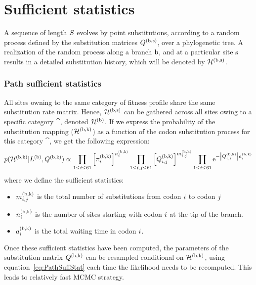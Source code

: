 \section{Sufficient statistics}

A sequence of length $S$ evolves by point \glspl{substitution}, according to a random process defined by the \gls{substitution} matrices $Q^{(\text{b}, \text{s})}$, over a phylogenetic tree.
A realization of the random process along a branch $\text{b}$, and at a particular site $\text{s}$ results in a detailed \gls{substitution} history, which will be denoted by $\mathcal{H}^{(\text{b}, \text{s})}$.

\subsubsection{Path sufficient statistics}
All sites owning to the same category of fitness profile share the same \gls{substitution} rate matrix.
Hence, $\mathcal{H}^{(\text{b}, \text{s})}$ can be gathered across all sites owing to a specific category $\cat$, denoted $\mathcal{H}^{(\text{b})}$.
If we express the probability of the \gls{substitution} mapping ($\mathcal{H}^{(\text{b}, \text{k})}$) as a function of the \gls{codon} \gls{substitution} process for this category $\cat$, we get the following expression:
\begin{equation}
    \label{eq:PathSuffStat}
    p(\mathcal{H}^{(\text{b}, \text{k})} | L^{(\text{b})}, Q^{(\text{b}, \text{k})}) \propto \prod_{1 \leq {i} \leq 61} \left[\pi_{{i}}^{(\text{b}, \text{k})}\right]^{n_{{i}}^{(\text{b}, \text{k})}} \prod_{ 1 \leq {i}, {j} \leq 61} \left[Q^{(\text{b}, \text{k})}_{{i}, {j}}\right]^{m_{{i}, {j}}^{(\text{b}, \text{k})}} \prod_{1 \leq {i} \leq 61} \mathrm{e}^{- \left| Q^{(\text{b}, \text{k})}_{{i}, {i}}\right| a_{{i}}^{(\text{b}, \text{k})}}
\end{equation}
where we define the sufficient statistics:
\begin{itemize}
    \setlength\itemsep{-0.25em}
    \item $m_{{i}, {j}}^{(\text{b}, \text{k})}$ is the total number of \glspl{substitution} from \gls{codon} ${i}$ to \gls{codon} ${j}$
    \item $n_{{i}}^{(\text{b}, \text{k})}$ is the number of sites starting with \gls{codon} ${i}$ at the tip of the branch.
    \item $a_{{i}}^{(\text{b}, \text{k})}$ is the total waiting time in \gls{codon} ${i}$.
\end{itemize}
Once these sufficient statistics have been computed, the parameters of the \gls{substitution} matrix $Q^{(\text{b}, \text{k})}$ can be resampled conditional on $\mathcal{H}^{(\text{b}, \text{k})}$,
using equation~\ref{eq:PathSuffStat} each time the \gls{likelihood} needs to be recomputed. This leads to relatively fast \acrshort{MCMC} strategy.

